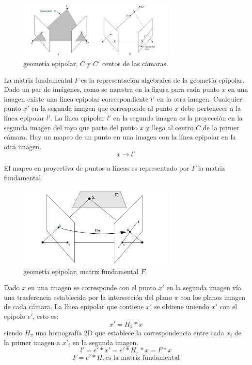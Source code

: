 \begin{figure}[H]
  \centering
    \includegraphics[width=0.7\textwidth]{./Cap2_videomapping/epipolar.PNG}
  \caption{geometía epipolar, $C$ y $C'$ centos de las cámaras.}%
  \label{fig:Epipolar}
\end{figure}
La matriz fundamental $F$ es la representación algebraica de la geometía epipolar.
Dado un par de imágenes, como se muestra en la figura para cada punto $x$ en una imagen existe una linea epipolar correspondiente $l'$ en la otra imagen. Cualquier punto $x'$ en la segunda imagen que corresponde al punto $x$ debe pertenecer a la linea epipolar $l'$.
La línea epipolar $l'$ en la segunda imagen es la proyección en la segunda imagen del rayo que parte del punto $x$ y llega al centro $C$ de la primer cámara. Hay un mapeo de un punto en una imagen con la línea epipolar en la otra imagen.
\[  x \to l'
\]
 
El mapeo en proyectiva de puntos a líneas es representado por $F$ la matriz fundamental.

\begin{figure}[H]
  \centering
    \includegraphics[width=0.7\textwidth]{./Cap2_videomapping/epipolar2.PNG}
  \caption{geometía epipolar, matriz fundamental $F$.} %
  \label{fig:Epipolar2}
\end{figure}
Dado $x$ en una imagen se corresponde con el punto $x'$ en la segunda imagen vía una trasferencia establecida por la intersección del plano $\pi$ con los planos imagen de cada cámara.
La línea epipolar que contiene $x'$ se obtiene uniendo $x'$ con el epipolo $e'$, esto es:
\[ x' = H_{\pi} * x \]    siendo  $H_{\pi}$ una homografía 2D que establece la correspondencia entre cada $x_i$ de la primer imagen a $x'_i$ en la segunda imagen.
\[ l' = e' * x' = e' * H_{\pi} * x = F * x  \]
\[ F = e' * H_{\pi}  \mbox{es la matriz fundamental}  \]